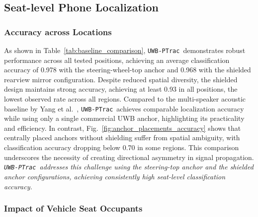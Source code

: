 \documentclass[sigconf]{acmart}
\newcommand{\name}{{{\tt UWB-PTrac}}}
\begin{document}
\subsection{Seat-level Phone Localization}

\subsubsection{Accuracy across Locations}
As shown in Table~\ref{tab:baseline_comparison}, \name\ demonstrates robust performance across all tested positions, achieving an average classification accuracy of 0.978 with the steering-wheel-top anchor and 0.968 with the shielded rearview mirror configuration.
%
Despite reduced spatial diversity, the shielded design maintains strong accuracy, achieving at least 0.93 in all positions, the lowest observed rate across all regions.
%
Compared to the multi-speaker acoustic baseline by Yang et al.~\cite{yang2011detecting}, \name\ achieves comparable localization accuracy while using only a single commercial UWB anchor, highlighting its practicality and efficiency.
In contrast, Fig.~\ref{fig:anchor_placements_accuracy} shows that centrally placed anchors without shielding suffer from spatial ambiguity, with classification accuracy dropping below 0.70 in some regions. This comparison underscores the necessity of creating directional asymmetry in signal propagation.
%
\textit{\name\ addresses this challenge using the steering-top anchor and the shielded anchor configurations, achieving consistently high seat-level classification accuracy.}

\subsubsection{Impact of Vehicle Seat Occupants}
\label{sec:evaluation:accuracy:occupant}
\end{document}
